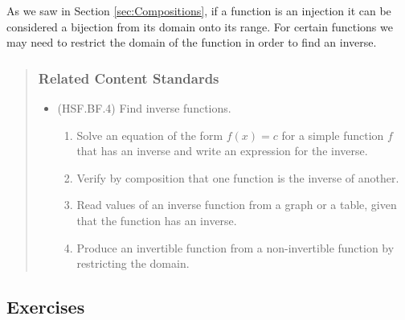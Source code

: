 \documentclass[
]{book}
\providecommand{\tightlist}{%
  \setlength{\itemsep}{0pt}\setlength{\parskip}{0pt}}
\theoremstyle{definition}
\theoremstyle{definition}
\theoremstyle{definition}
\theoremstyle{remark}
\begin{document}
As we saw in Section \ref{sec:Compositions}, if a function is an injection it can be considered a bijection from its domain onto its range. For certain functions we may need to restrict the domain of the function in order to find an inverse.

\begin{quote}
\hypertarget{related-content-standards-40}{%
\subsubsection*{Related Content Standards}\label{related-content-standards-40}}

\begin{itemize}
\tightlist
\item
  (HSF.BF.4) Find inverse functions.

  \begin{enumerate}
  \def\labelenumi{\alph{enumi}.}
  \tightlist
  \item
    Solve an equation of the form \(f(x) = c\) for a simple function \(f\) that has an inverse and write an expression for the inverse.
  \item
    Verify by composition that one function is the inverse of another.
  \item
    Read values of an inverse function from a graph or a table, given that the function has an inverse.
  \item
    Produce an invertible function from a non-invertible function by restricting the domain.
  \end{enumerate}
\end{itemize}
\end{quote}

\hypertarget{exercises-27}{%
\subsection{Exercises}\label{exercises-27}}
\end{document}
